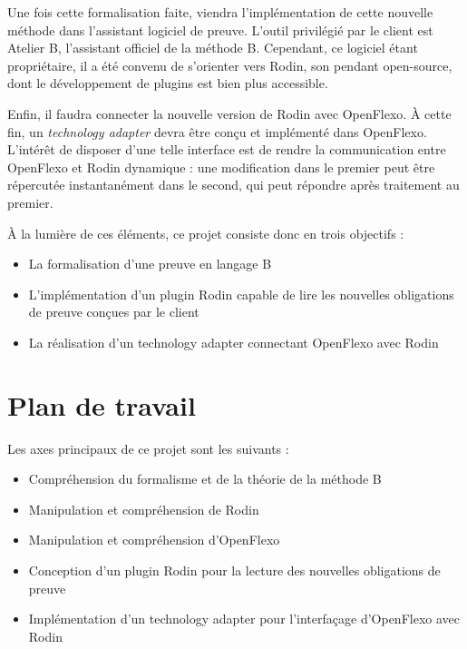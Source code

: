 \documentclass{article}
\begin{document}
Une fois cette formalisation faite, viendra l'implémentation de cette nouvelle méthode dans l'assistant logiciel de preuve.
L'outil privilégié par le client est Atelier B, l'assistant officiel de la méthode B.
Cependant, ce logiciel étant propriétaire, il a été convenu de s'orienter vers Rodin, son pendant open-source, dont le développement de plugins est bien plus accessible.

Enfin, il faudra connecter la nouvelle version de Rodin avec OpenFlexo.
À cette fin, un \textit{technology adapter} devra être conçu et implémenté dans OpenFlexo.
L'intérêt de disposer d'une telle interface est de rendre la communication entre OpenFlexo et Rodin dynamique : une modification dans le premier peut être répercutée instantanément %
dans le second, qui peut répondre après traitement au premier.

À la lumière de ces éléments, ce projet consiste donc en trois objectifs :

\vspace{\baselineskip}
\begin{itemize}
    \item La formalisation d'une preuve en langage B
    \item L'implémentation d'un plugin Rodin capable de lire les nouvelles obligations de preuve conçues par le client
    \item La réalisation d'un technology adapter connectant OpenFlexo avec Rodin
\end{itemize}

\newpage



\section{Plan de travail}

Les axes principaux de ce projet sont les suivants :

\vspace{\baselineskip}
\begin{itemize}
    \item Compréhension du formalisme et de la théorie de la méthode B
    \item Manipulation et compréhension de Rodin
    \item Manipulation et compréhension d'OpenFlexo
    \item Conception d'un plugin Rodin pour la lecture des nouvelles obligations de preuve
    \item Implémentation d'un technology adapter pour l'interfaçage d'OpenFlexo avec Rodin
\end{itemize}
\vspace{\baselineskip}
\end{document}
